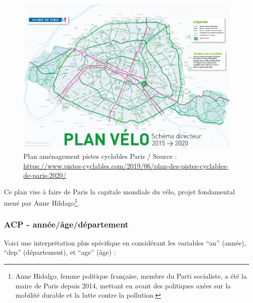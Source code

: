 \documentclass[french,]{compterendu}
\let\rmarkdownfootnote\footnote%
\def\footnote{\protect\rmarkdownfootnote}
\theoremstyle{urcastyle}
\theoremstyle{remark}
\begin{document}
\begin{figure}
\centering
\includegraphics{../VELO.png}
\caption{Plan aménagement pistes cyclables Paris / Source : \url{https://www.pistes-cyclables.com/2019/06/plan-des-pistes-cyclables-de-paris-2020/}}
\end{figure}

Ce plan vise à faire de Paris la capitale mondiale du vélo, projet fondamental mené par Anne Hildago\footnote{Anne Hidalgo, femme politique française, membre du Parti socialiste, a été la maire de Paris depuis 2014, mettant en avant des politiques axées sur la mobilité durable et la lutte contre la pollution.}.

\newpage

\hypertarget{acp---annuxe9euxe2geduxe9partement}{%
\subsubsection{ACP - année/âge/département}\label{acp---annuxe9euxe2geduxe9partement}}

Voici une interprétation plus spécifique en considérant les variables ``an'' (année), ``dep'' (département), et ``age'' (âge) :
\end{document}
